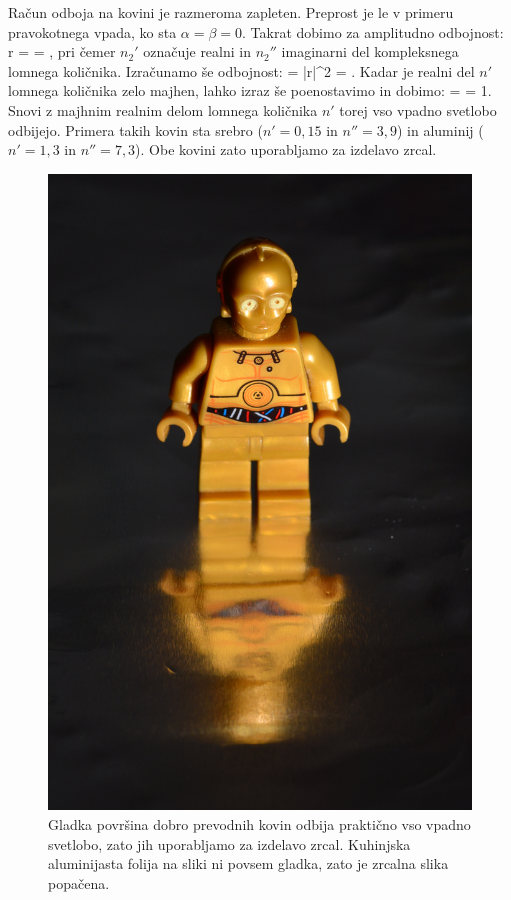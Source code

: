 Račun odboja na kovini je razmeroma zapleten. Preprost je le v primeru pravokotnega vpada, 
ko sta $\alpha = \beta = 0$. Takrat dobimo za amplitudno odbojnost:
\beq
r =  = ,
\label{eq:04_101}
\eeq
pri čemer $n_2'$ označuje realni in $n_2''$ imaginarni del kompleksnega lomnega količnika.
Izračunamo še odbojnost:
\beq
{} = |r|^2 = .
\label{eq:04_102}
\eeq
Kadar je realni del $n'$ lomnega količnika zelo majhen, lahko izraz še poenostavimo 
in dobimo:
\beq
{} =  = 1.
\label{eq:04_103}
\eeq
Snovi z majhnim realnim delom lomnega količnika $n'$ torej vso vpadno 
svetlobo odbijejo. Primera takih kovin sta srebro ($n'=0,15$ in $n''=3,9$)
in aluminij ($n'=1,3$ in $n''=7,3$). Obe kovini zato uporabljamo za izdelavo
zrcal.
\begin{figure}[ht]
\centering
\includegraphics[width=6truecm]{slike/04_photos_kovina.jpg}
\caption{Gladka površina dobro prevodnih kovin odbija praktično 
vso vpadno svetlobo, zato jih uporabljamo za izdelavo zrcal. Kuhinjska aluminijasta
folija na sliki ni povsem gladka, zato je zrcalna slika popačena.}
\label{fig:04_KovinaFoto}
\end{figure}
